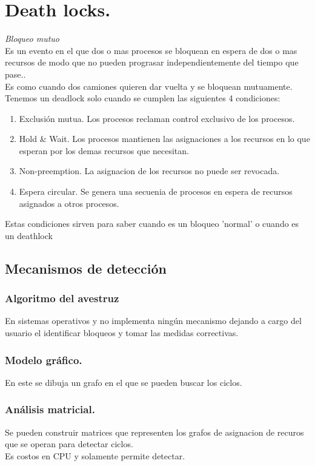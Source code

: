 \newpage
\chapter{Death locks.}

\textit{Bloqueo mutuo}\\
Es un evento en el que dos o mas procesos se bloquean en espera de dos o mas recursos de modo que no pueden prograsar independientemente del tiempo que pase..\\
Es como cuando dos camiones quieren dar vuelta y se bloquean mutuamente.\\

Tenemos un deadlock solo cuando se cumplen las siguientes 4 condiciones:
\begin{enumerate}
	\item Exclusi\'{o}n mutua. Los procesos reclaman control exclusivo de los procesos.
	\item Hold \& Wait. Los procesos mantienen las asignaciones a los recursos en lo que esperan por los demas recursos que necesitan.
	\item Non-preemption. La asignacion de los recursos no puede ser revocada.
	\item Espera circular. Se genera una secuenia de procesos en espera de recursos asignados a otros procesos.
\end{enumerate}
Estas condiciones sirven para saber cuando es un bloqueo 'normal' o cuando es un deathlock

\section{Mecanismos de detecci\'{o}n}

\subsection{Algoritmo del avestruz}
En sistemas operativos y no implementa ning\'{u}n mecanismo dejando a cargo del usuario el identificar bloqueos y tomar las medidas correctivas.\\
\subsection{Modelo gr\'{a}fico.}
En este se dibuja un grafo en el que se pueden buscar los ciclos.\\
\subsection{An\'{a}lisis matricial.}
Se pueden construir matrices que representen los grafos de asignacion de recuros que se operan para detectar ciclos.\\
Es costos en CPU y solamente permite detectar.
